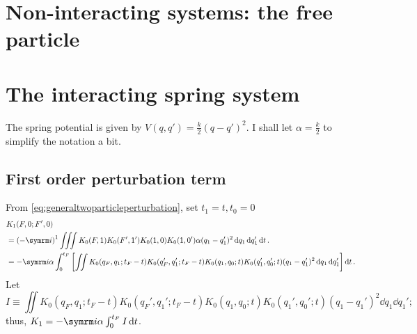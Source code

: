 \section{Non-interacting systems: the free particle}

\section{The interacting spring system}

The spring potential is given by $V(q, q') = \frac{k}{2}(q - q')^2$. I shall let $\alpha = \frac{k}{2}$ to simplify the notation a bit.

\subsection{First order perturbation term}
\label{sec:spring_1storder}

From \cref{eq:generaltwoparticleperturbation}, set $t_1 = t, t_0 = 0$
\begin{align}
    &K_1(F, 0; F', 0) \nonumber \\
    &= \left(-\im\right)^1\iiint K_0(F, 1)K_0(F', 1')K_0(1, 0)K_0(1, 0')\alpha(q_1 - q_1')^2\dd{q_1}\dd{q_1'}\dd{t}. \\
    &= -\im\alpha\int_0^{t_F}\left[\iint K_0(q_F, q_1; t_F - t)K_0(q_F', q_1'; t_F - t)K_0(q_1, q_0; t)K_0(q_1', q_0'; t)(q_1 - q_1')^2\dd{q_1}\dd{q_1'}\right]\dd{t}. \nonumber
\end{align}
Let
\begin{equation}
    I \equiv \iint K_0(q_F, q_1; t_F - t)K_0(q_F', q_1'; t_F - t)K_0(q_1, q_0; t)K_0(q_1', q_0'; t)(q_1 - q_1')^2\dd{q_1}\dd{q_1'};
\end{equation}
thus, $K_1 = -\im\alpha\int_0^{t_F} I\dd{t}$.

